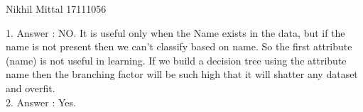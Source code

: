 \documentclass[a4paper,11pt]{article}
\begin{document}
                {Nikhil Mittal}                               %
                {17111056}                                    %

\begin{mlsolution}

1. Answer : NO. It is useful only when the Name exists in the data, but if the name is not present then we can't classify based on name. So the first attribute (name) is not useful in learning.
If we build a decision tree using the attribute name then the branching factor will be such high that it will shatter any dataset and overfit.
\\

2. Answer : Yes.\\


\end{mlsolution}
\end{document}
